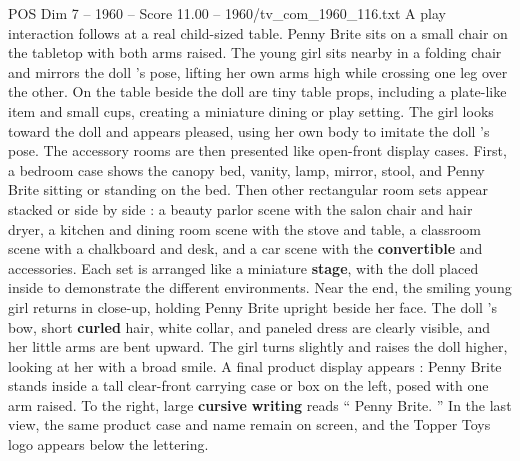 \begin{textsample}{POS Dim 7 – 1960 – Score 11.00 – 1960/tv\_com\_1960\_116.txt}
A play interaction follows at a real child-sized table.
Penny Brite sits on a small chair on the tabletop with both arms raised.
The young girl sits nearby in a folding chair and mirrors the doll ’s pose, lifting her own arms high while crossing one leg over the other.
On the table beside the doll are tiny table props, including a plate-like item and small cups, creating a miniature dining or play setting.
The girl looks toward the doll and appears pleased, using her own body to imitate the doll ’s pose.
The accessory rooms are then presented like open-front display cases.
First, a bedroom case shows the canopy bed, vanity, lamp, mirror, stool, and Penny Brite sitting or standing on the bed.
Then other rectangular room sets appear stacked or side by side : a beauty parlor scene with the salon chair and hair dryer, a kitchen and dining room scene with the stove and table, a classroom scene with a chalkboard and desk, and a car scene with the \textbf{convertible} and accessories.
Each set is arranged like a miniature \textbf{stage}, with the doll placed inside to demonstrate the different environments.
Near the end, the smiling young girl returns in close-up, holding Penny Brite upright beside her face.
The doll ’s bow, short \textbf{curled} hair, white collar, and paneled dress are clearly visible, and her little arms are bent upward.
The girl turns slightly and raises the doll higher, looking at her with a broad smile.
A final product display appears : Penny Brite stands inside a tall clear-front carrying case or box on the left, posed with one arm raised.
To the right, large \textbf{cursive} \textbf{writing} reads “ Penny Brite. ” In the last view, the same product case and name remain on screen, and the Topper Toys logo appears below the lettering.

\end{textsample}
